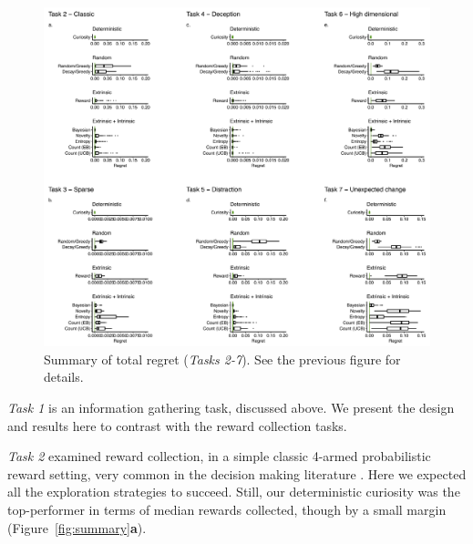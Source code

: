 \begin{figure}
    \label{fig:supp_regret} 
	\includegraphics[width=11.4cm]{img/supp_regret.pdf} 
	\caption{Summary of total regret (\textit{Tasks 2-7}). See the previous figure for details.}
\end{figure}


\textit{Task 1} is an information gathering task, discussed above. We present the design and results here to contrast with the reward collection tasks. 

\textit{Task 2} examined reward collection, in a simple classic 4-armed probabilistic reward setting, very common in the decision making literature \cite{schonberg2007reinforcement,frank2004carrot,cavanagh2014conflict,jahfari2019cross,collins2014opponent,collins2017interactions,glascher2010states}. Here we expected all the exploration strategies to succeed. Still, our deterministic curiosity was the top-performer in terms of median rewards collected, though by a small margin (Figure~\ref{fig:summary}\textbf{a}).

